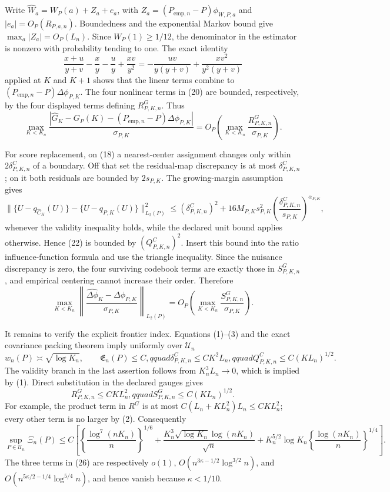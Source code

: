 Write \(\widehat W_a=W_P(a)+Z_a+e_a\), with \(Z_a=(P_{\mathrm{emp},n}-P)\phi_{W,P,a}\) and \(|e_a|=O_P(R_{P,a,n})\).  Boundedness and the exponential Markov bound give \(\max_a|Z_a|=O_P(L_n)\).  Since \(W_P(1)\geq1/12\), the denominator in the estimator is nonzero with probability tending to one.  The exact identity
\[
 \frac{x+u}{y+v}-\frac xy-\frac uy+\frac{xv}{y^2}
 =-\frac{uv}{y(y+v)}+\frac{xv^2}{y^2(y+v)}                                      \tag{20}
\]
applied at \(K\) and \(K+1\) shows that the linear terms combine to \((P_{\mathrm{emp},n}-P)\Delta\phi_{P,K}\).  The four nonlinear terms in (20) are bounded, respectively, by the four displayed terms defining \(R^G_{P,K,n}\).  Thus
\[
 \max_{K<K_n}\frac{|\widehat G_K-G_P(K)-(P_{\mathrm{emp},n}-P)\Delta\phi_{P,K}|}{\sigma_{P,K}}
 =O_P\!\left(\max_{K<K_n}\frac{R^G_{P,K,n}}{\sigma_{P,K}}\right).              \tag{21}
\]

For score replacement, on (18) a nearest-center assignment changes only within \(2\delta^C_{P,K,n}\) of a boundary.  Off that set the residual-map discrepancy is at most \(\delta^C_{P,K,n}\); on it both residuals are bounded by \(2s_{P,K}\).  The growing-margin assumption gives
\[
 \|\{U-q_{\widehat C_K}(U)\}-\{U-q_{P,K}(U)\}\|_{L_2(P)}^2
 \leq(\delta^C_{P,K,n})^2+16M_{P,K}s_{P,K}^2
 \left(\frac{\delta^C_{P,K,n}}{s_{P,K}}\right)^{\alpha_{P,K}},                 \tag{22}
\]
whenever the validity inequality holds, while the declared unit bound applies otherwise.  Hence (22) is bounded by \((Q^C_{P,K,n})^2\).  Insert this bound into the ratio influence-function formula and use the triangle inequality.  Since the nuisance discrepancy is zero, the four surviving codebook terms are exactly those in \(S^G_{P,K,n}\), and empirical centering cannot increase their order.  Therefore
\[
 \max_{K<K_n}\left\|
 \frac{\widehat{\Delta\phi}_K-\Delta\phi_{P,K}}{\sigma_{P,K}}
 \right\|_{L_2(P)}
 =O_P\!\left(\max_{K<K_n}\frac{S^G_{P,K,n}}{\sigma_{P,K}}\right).              \tag{23}
\]

It remains to verify the explicit frontier index.  Equations (1)--(3) and the exact covariance packing theorem imply uniformly over \(\mathcal U_n\)
\[
 w_n(P)\asymp\sqrt{\log K_n},\qquad
 \mathfrak E_n(P)\leq C,qquad
 \delta^C_{P,K,n}\leq CK^2L_n,qquad
 Q^C_{P,K,n}\leq C(KL_n)^{1/2}.                                                  \tag{24}
\]
The validity branch in the last assertion follows from \(K_n^3L_n\to0\), which is implied by (1).  Direct substitution in the declared gauges gives
\[
 R^G_{P,K,n}\leq CKL_n^2,qquad S^G_{P,K,n}\leq C(KL_n)^{1/2}.                  \tag{25}
\]
For example, the product term in \(R^G\) is at most \(C(L_n+KL_n^2)L_n\leq CKL_n^2\); every other term is no larger by (2).  Consequently
\[
 \sup_{P\in\mathcal U_n}\Xi_n(P)
 \leq C\left[\left\{\frac{\log^7(nK_n)}n\right\}^{1/6}
 +\frac{K_n^3\sqrt{\log K_n}\log(nK_n)}{\sqrt n}
 +K_n^{5/2}\log K_n\left\{\frac{\log(nK_n)}n\right\}^{1/4}\right].          \tag{26}
\]
The three terms in (26) are respectively \(o(1)\),
\(O(n^{3\kappa-1/2}\log^{3/2}n)\), and
\(O(n^{5\kappa/2-1/4}\log^{5/4}n)\), and hence vanish because \(\kappa<1/10\).

